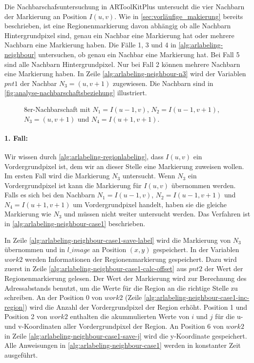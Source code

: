 

Die Nachbarschafsuntersuchung in ARToolKitPlus untersucht die vier Nachbarn der Markierung an Position $I(u,v)$. Wie in
 \autoref{sec:vorläufige_makierung} bereits beschrieben, ist eine Regionenmarkierung davon abhängig ob alle Nachbarn
 Hintergrundpixel sind, genau ein Nachbar eine Markierung hat oder mehrere Nachbarn eine Markierung haben. Die Fälle
 1, 3 und 4 in \autoref{alg:arlabeling-neighbour} untersuchen, ob genau ein Nachbar eine Markierung hat. Bei Fall 5 sind
 alle Nachbarn Hintergrundpixel. Nur bei Fall 2 können  mehrere Nachbarn eine Markierung haben. In Zeile
 \ref{alg:arlabeling-neighbour-n3} wird der Variablen $\mathit{pnt1}$ der Nachbar $N_3 = (u,v+1)$ zugewiesen. Die
 Nachbarn sind in \autoref{fig:analyse-nachbarschaftsbeziehung} illustriert.

\begin{figure}[!ht]
	\centering
	
	\caption{8er-Nachbarschaft mit $N_1 = I(u-1,v)$, $N_2 = I(u-1,v+1)$, $N_3 = (u,v+1)$ und $N_4 = I(u+1,v+1)$.}
	\label{fig:analyse-nachbarschaftsbeziehung}
\end{figure}

\paragraph{1. Fall:} %
\label{par:fall_1_}
Wir wissen durch \autoref{alg:arlabeling-regionlabeling}, dass $I(u,v)$ ein Vordergrundpixel ist, dem wir an dieser
 Stelle eine Markierung zuweisen wollen. Im ersten Fall wird die Markierung $N_3$ untersucht. Wenn $N_3$ ein
 Vordergrundpixel ist kann die Markierung für $I(u,v)$ übernommen werden. Falls es sich bei den Nachbarn
 $N_1 = I(u-1,v)$, $N_2 = I(u-1,v+1)$ und $N_4 = I(u+1,v+1)$ um Vordergrundpixel handelt, haben sie die gleiche
 Markierung wie $N_3$ und müssen nicht weiter untersucht werden. Das Verfahren ist in
 \autoref{alg:arlabeling-neighbour-case1} beschrieben.



In Zeile \ref{alg:arlabeling-neighbour-case1-save-label} wird die Markierung von $N_3$ übernommen und in
 $\mathit{l\_image}$ an Position $(x,y)$ gespeichert. In der Variablen $\mathit{work2}$ werden Informationen der
 Regionenmarkierung gespeichert. Dazu wird zuerst in Zeile \ref{alg:arlabeling-neighbour-case1-calc-offset} aus
 $\mathit{pnt2}$ der Wert der Regionenmarkierung gelesen. Der Wert der Markierung wird zur Berechnung des
 Adressabstands benutzt, um die Werte für die Region an die richtige Stelle zu schreiben. An der Position $0$ von
 $\mathit{work2}$ (Zeile \ref{alg:arlabeling-neighbour-case1-inc-region}) wird die Anzahl der Vordergrundpixel der
 Region erhöht. Position 1 und Position 2 von $\mathit{work2}$ enthalten die akummulierten Werte von $i$ und $j$ für
 die u- und v-Koordinaten aller Vordergrundpixel der Region. An Position 6 von $\mathit{work2}$ in Zeile
 \ref{alg:arlabeling-neighbour-case1-save-j} wird die y-Koordinate gespeichert. Alle Anweisungen in
 \autoref{alg:arlabeling-neighbour-case1} werden in konstanter Zeit ausgeführt.

